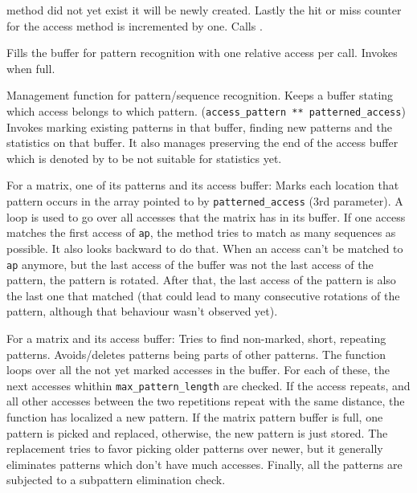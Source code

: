 \begin{description}
    method did not yet exist it will be newly created. Lastly the hit or miss counter for the access method is incremented
	by one. Calls .
\item[\fun{update\_matrix\_pattern\_stats}] Fills the buffer for pattern recognition with one relative access per call. Invokes  when full.
\item[\fun{process\_pattern\_buffer(traced\_matrix*)}] Management function for pattern/sequence recognition. Keeps a buffer stating which access belongs to which pattern. (\texttt{access\_pattern ** patterned\_access}) Invokes marking existing patterns in that buffer, finding new patterns and the statistics on that buffer. It also manages preserving the end of the access buffer which is denoted by  to be not suitable for statistics yet.
\item[\fun{mark\_pattern\_findings}] For a matrix, one of its patterns and its access buffer: Marks each location that pattern occurs in the array pointed to by \texttt{patterned\_access} (3rd parameter).\newline
	A loop is used to go over all accesses that the matrix has in its buffer. If one access matches the first access of \texttt{ap}, the method tries to match as many sequences as possible. It also looks backward to do that. When an access can't be matched to \texttt{ap} anymore, but the last access of the buffer was not the last access of the pattern, the pattern is rotated. After that, the last access of the pattern is also the last one that matched (that could lead to many consecutive rotations of the pattern, although that behaviour wasn't observed yet).
\item[\fun{find\_new\_patterns}] For a matrix and its access buffer: Tries to find non-marked, short, repeating patterns. Avoids/deletes patterns being parts of other patterns.\newline
	The function loops over all the not yet marked accesses in the buffer. For each of these, the next accesses whithin \texttt{max\_pattern\_length} are checked. If the access repeats, and all other accesses between the two repetitions repeat with the same distance, the function has localized a new pattern. If the matrix pattern buffer is full, one pattern is picked and replaced, otherwise, the new pattern is just stored. The replacement tries to favor picking older patterns over newer, but it generally eliminates patterns which don't have much accesses. Finally, all the patterns are subjected to a subpattern elimination check.

\end{description}
